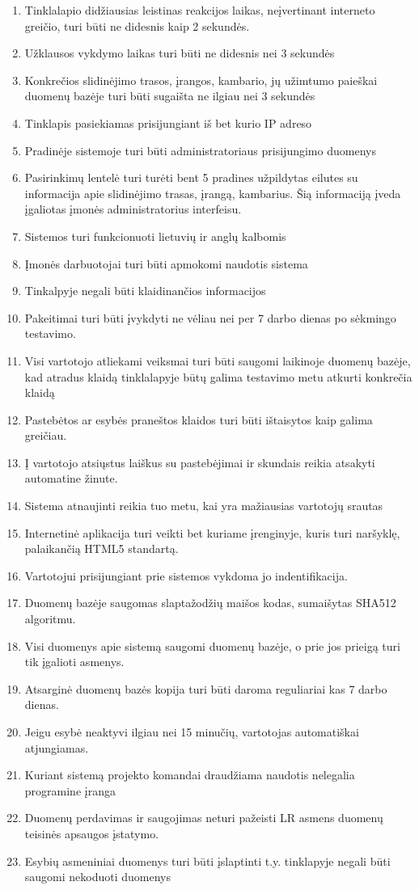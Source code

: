 \documentclass[oneside]{VUMIFPSkursinis}
\begin{document}
\begin{enumerate}
	\item Tinklalapio didžiausias leistinas reakcijos laikas, neįvertinant interneto greičio, turi būti ne didesnis kaip 2 sekundės.
	\item Užklausos vykdymo laikas turi būti ne didesnis nei 3 sekundės
	\item Konkrečios slidinėjimo trasos, įrangos, kambario, jų užimtumo paieškai duomenų bazėje turi būti sugaišta ne ilgiau nei 3 sekundės
	\item Tinklapis pasiekiamas prisijungiant iš bet kurio IP adreso
	\item Pradinėje sistemoje turi būti administratoriaus prisijungimo duomenys
	\item Pasirinkimų lentelė turi turėti bent 5 pradines užpildytas eilutes su informacija apie slidinėjimo trasas, įrangą, kambarius. Šią informaciją įveda įgaliotas įmonės administratorius interfeisu.
	\item Sistemos turi funkcionuoti lietuvių ir anglų kalbomis
	\item Įmonės darbuotojai turi būti apmokomi naudotis sistema
	\item Tinkalpyje negali būti klaidinančios informacijos
	\item Pakeitimai turi būti įvykdyti ne vėliau nei per 7 darbo dienas po sėkmingo testavimo.
	\item Visi vartotojo atliekami veiksmai turi būti saugomi laikinoje duomenų bazėje, kad atradus klaidą tinklalapyje būtų galima testavimo metu atkurti konkrečia klaidą
	\item Pastebėtos ar esybės praneštos klaidos turi būti ištaisytos kaip galima greičiau.
	\item Į vartotojo atsiųstus laiškus su pastebėjimai ir skundais reikia atsakyti automatine žinute.
	\item Sistema atnaujinti reikia tuo metu, kai yra mažiausias vartotojų srautas
	\item Internetinė aplikacija turi veikti bet kuriame įrenginyje, kuris turi naršyklę, palaikančią HTML5 standartą.
	\item Vartotojui prisijungiant prie sistemos vykdoma jo indentifikacija.
	\item Duomenų bazėje saugomas slaptažodžių maišos kodas, sumaišytas SHA512 algoritmu.
	\item Visi duomenys apie sistemą saugomi duomenų bazėje, o prie jos prieigą turi tik įgalioti asmenys.
	\item Atsarginė duomenų bazės kopija turi būti daroma reguliariai kas 7 darbo dienas.
	\item Jeigu esybė neaktyvi ilgiau nei 15 minučių, vartotojas automatiškai atjungiamas.
	\item Kuriant sistemą projekto komandai draudžiama naudotis nelegalia programine įranga
	\item Duomenų perdavimas ir saugojimas neturi pažeisti LR asmens duomenų teisinės apsaugos įstatymo.
	\item Esybių asmeniniai duomenys turi būti įslaptinti t.y. tinklapyje negali būti saugomi nekoduoti duomenys


\end{enumerate}
\end{document}
